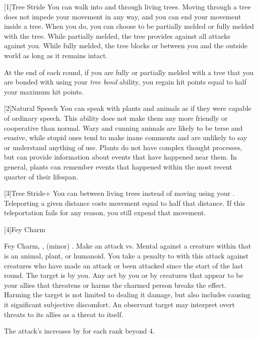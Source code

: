     [1]{Tree Stride} You can walk into and through living trees.
      Moving through a tree does not impede your movement in any way, and you can end your movement inside a tree.
      When you do, you can choose to be partially melded or fully melded with the tree.
      While partially melded, the tree provides  against all attacks against you.
      While fully melded, the tree blocks  or  between you and the outside world as long as it remains intact.

      At the end of each round, if you are fully or partially melded with a tree that you are bonded with using your \textit{tree bond} ability, you regain hit points equal to half your maximum hit points.

    [2]{Natural Speech} You can speak with plants and animals as if they were capable of ordinary speech.
      This ability does not make them any more friendly or cooperative than normal.
      Wary and cunning animals are likely to be terse and evasive, while stupid ones tend to make inane comments and are unlikely to say or understand anything of use.
      Plants do not have complex thought processes, but can provide information about events that have happened near them.
      In general, plants can remember events that happened within the most recent quarter of their lifespan.

    [3]{Tree Stride+} You can  between living trees instead of moving using your .
      Teleporting a given distance costs movement equal to half that distance.
      If this teleportation fails for any reason, you still expend that movement.

    [4]{Fey Charm}
      \begin{magicalsustainability}{Fey Charm}{, ,  (minor)}
        \abilityusagetime {}.
        \rankline
        Make an attack vs. Mental against a creature within \medrange that is an animal, plant, or humanoid.
        You take a  penalty to  with this attack against creatures who have made an attack or been attacked since the start of the last round.
        \hit The target is \charmed by you.
        Any act by you or by creatures that appear to be your allies that threatens or harms the charmed person breaks the effect.
        Harming the target is not limited to dealing it damage, but also includes causing it significant subjective discomfort.
        An observant target may interpret overt threats to its allies as a threat to itself.

        \rankline

        \noindent The attack's  increases by  for each rank beyond 4.
      \end{magicalsustainability}

